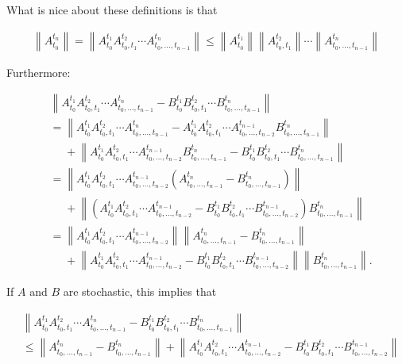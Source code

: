 \documentclass[a4paper,reqno]{amsart}
\newcommand{\norm}[1]{\left\lVert #1 \right\rVert}
\begin{document}
What is nice about these definitions is that

\begin{align*}
\norm{A^{t_n}_{t_0}}
=\norm{
	A_{t_0}^{t_1}
	A_{t_0,t_1}^{t_2}
	\cdots
	A_{t_0,\dots,t_{n-1}}^{t_n}
}
\leq
\norm{A_{t_0}^{t_1}}
	\norm{A_{t_0,t_1}^{t_2}}
	\cdots
	\norm{A_{t_0,\dots,t_{n-1}}^{t_n}}
\end{align*}

Furthermore:

\begin{align*}
&\norm{
	A_{t_0}^{t_1}
	A_{t_0,t_1}^{t_2}
	\cdots
	A_{t_0,\dots,t_{n-1}}^{t_n}
	-
	B_{t_0}^{t_1}
	B_{t_0,t_1}^{t_2}
	\cdots
	B_{t_0,\dots,t_{n-1}}^{t_n}
}\\
&=
\norm{
	A_{t_0}^{t_1}
	A_{t_0,t_1}^{t_2}
	\cdots
	A_{t_0,\dots,t_{n-1}}^{t_n}
	-
	A_{t_0}^{t_1}
	A_{t_0,t_1}^{t_2}
	\cdots
	A_{t_0,\dots,t_{n-2}}^{t_{n-1}}
	B_{t_0,\dots,t_{n-1}}^{t_n}}\\
	&~~~~~~+
	\norm{
	A_{t_0}^{t_1}
	A_{t_0,t_1}^{t_2}
	\cdots
	A_{t_0,\dots,t_{n-2}}^{t_{n-1}}
	B_{t_0,\dots,t_{n-1}}^{t_n}
	-
	B_{t_0}^{t_1}
	B_{t_0,t_1}^{t_2}
	\cdots
	B_{t_0,\dots,t_{n-1}}^{t_n}
}\\
&=
\norm{
	A_{t_0}^{t_1}
	A_{t_0,t_1}^{t_2}
	\cdots
	A_{t_0,\dots,t_{n-2}}^{t_{n-1}}
	(A_{t_0,\dots,t_{n-1}}^{t_n}-
	B_{t_0,\dots,t_{n-1}}^{t_n})
	}\\
	&~~~~~~+
	\norm{
	(A_{t_0}^{t_1}
	A_{t_0,t_1}^{t_2}
	\cdots
	A_{t_0,\dots,t_{n-2}}^{t_{n-1}}
	-
	B_{t_0}^{t_1}
	B_{t_0,t_1}^{t_2}
	\cdots
	B_{t_0,\dots,t_{n-2}}^{t_{n-1}})
	B_{t_0,\dots,t_{n-1}}^{t_n}
}\\
&=
\norm{
	A_{t_0}^{t_1}
	A_{t_0,t_1}^{t_2}
	\cdots
	A_{t_0,\dots,t_{n-2}}^{t_{n-1}}}
	\norm{A_{t_0,\dots,t_{n-1}}^{t_n}-
	B_{t_0,\dots,t_{n-1}}^{t_n}
	}\\
	&~~~~~~+
	\norm{
	A_{t_0}^{t_1}
	A_{t_0,t_1}^{t_2}
	\cdots
	A_{t_0,\dots,t_{n-2}}^{t_{n-1}}
	-
	B_{t_0}^{t_1}
	B_{t_0,t_1}^{t_2}
	\cdots
	B_{t_0,\dots,t_{n-2}}^{t_{n-1}}
	}
	\norm{
	B_{t_0,\dots,t_{n-1}}^{t_n}
}.
\end{align*}

If $A$ and $B$ are stochastic, this implies that

\begin{align*}
&\norm{
	A_{t_0}^{t_1}
	A_{t_0,t_1}^{t_2}
	\cdots
	A_{t_0,\dots,t_{n-1}}^{t_n}
	-
	B_{t_0}^{t_1}
	B_{t_0,t_1}^{t_2}
	\cdots
	B_{t_0,\dots,t_{n-1}}^{t_n}
}\\
&\leq
\norm{A_{t_0,\dots,t_{n-1}}^{t_n}-
	B_{t_0,\dots,t_{n-1}}^{t_n}
	}+
	\norm{
	A_{t_0}^{t_1}
	A_{t_0,t_1}^{t_2}
	\cdots
	A_{t_0,\dots,t_{n-2}}^{t_{n-1}}
	-
	B_{t_0}^{t_1}
	B_{t_0,t_1}^{t_2}
	\cdots
	B_{t_0,\dots,t_{n-2}}^{t_{n-1}}
	}
\end{align*}

 
%
\end{document}
